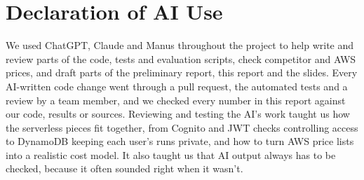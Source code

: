 \documentclass[10.5pt,a4paper]{article}
\begin{document}
\section*{Declaration of AI Use}
We used ChatGPT, Claude and Manus throughout the project to help write and review parts of the code, tests and evaluation scripts, check competitor and AWS prices, and draft parts of the preliminary report, this report and the slides. Every AI-written code change went through a pull request, the automated tests and a review by a team member, and we checked every number in this report against our code, results or sources. Reviewing and testing the AI's work taught us how the serverless pieces fit together, from Cognito and JWT checks controlling access to DynamoDB keeping each user's runs private, and how to turn AWS price lists into a realistic cost model. It also taught us that AI output always has to be checked, because it often sounded right when it wasn't.
\small
\end{document}
